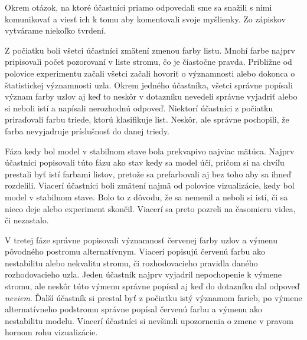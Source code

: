 \label{fig:graph-times}
Okrem otázok, na ktoré účastníci priamo odpovedali sme sa snažili s nimi komunikovať a viesť ich k tomu aby komentovali svoje myšlienky. Zo zápiskov vytvárame niekoľko tvrdení.
\par
Z počiatku boli všetci účastníci zmätení zmenou farby listu. Mnohí farbe najprv pripisovali počet pozorovaní v liste stromu, čo je čiastočne pravda. Približne od polovice experimentu začali všetci začali hovoriť o významnosti alebo dokonca o štatistickej významnosti uzla. Okrem jedného účastníka, všetci správne popísali význam farby uzlov aj keď to neskôr v dotazníku nevedeli správne vyjadriť alebo si neboli istí a napísali nerozhodnú odpoveď. Niektorí účastníci z počiatku priraďovali farbu triede, ktorú klasifikuje list. Neskôr, ale správne pochopili, že farba nevyjadruje príslušnosť do danej triedy.
\par
Fáza kedy bol model v stabilnom stave bola prekvapivo najviac mätúca. Najprv účastníci popisovali túto fázu ako stav kedy sa model účí, pričom si na chvíľu prestali byť istí farbami listov, pretože sa prefarbovali aj bez toho aby sa ihneď rozdelili. Viacerí účastníci boli zmätení najmä od polovice vizualizácie, kedy bol model v stabilnom stave. Bolo to z dôvodu, že sa nemenil a neboli si istí, či sa nieco deje alebo experiment skončil. Viacerí sa preto pozreli na časomieru videa, či nezastalo.
\par
V tretej fáze správne popisovali významnosť červenej farby uzlov a výmenu pôvodného postromu alternatívnym. Viacerí popisujú červenú farbu ako nestabilitu alebo nekvalitu stromu, či rozhodovacieho pravidla daného rozhodovacieho uzla. Jeden účastník najprv vyjadril nepochopenie k výmene stromu, ale neskôr túto výmenu správne popísal aj keď do dotazníku dal odpoveď \textit{neviem}. Ďalší účastník si prestal byť z počiatku istý významom farieb, po výmene alternatívneho podstromu správne popísal červenú farbu a výmenu ako nestabilitu modelu. Viacerí účastníci si nevšimli upozornenia o zmene v pravom hornom rohu vizualizácie.
\par
